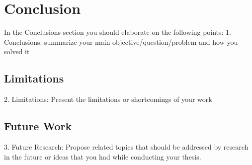 \chapter{Conclusion}
\label{sec:Conclusion}

In the Conclusions section you should elaborate on the following points:
1. Conclusions: summarize your main objective/question/problem and how you solved it
\section{Limitations}
2. Limitations: Present the limitations or shortcomings of your work
\section{Future Work}
3. Future Research: Propose related topics that should be addressed by research in the future or ideas that you had while conducting your thesis. 


